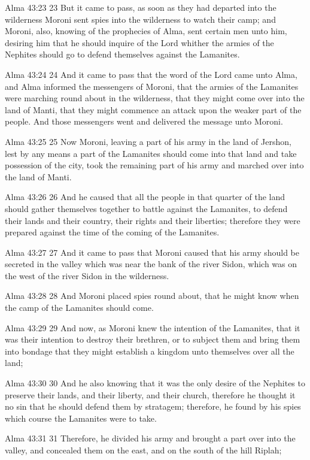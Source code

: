 Alma 43:23
 23 But it came to pass, as soon as they had departed into the
wilderness Moroni sent spies into the wilderness to watch their
camp; and Moroni, also, knowing of the prophecies of Alma, sent
certain men unto him, desiring him that he should inquire of the
Lord whither the armies of the Nephites should go to defend
themselves against the Lamanites.

Alma 43:24
 24 And it came to pass that the word of the Lord came unto Alma,
and Alma informed the messengers of Moroni, that the armies of
the Lamanites were marching round about in the wilderness, that
they might come over into the land of Manti, that they might
commence an attack upon the weaker part of the people. And those
messengers went and delivered the message unto Moroni.

Alma 43:25
 25 Now Moroni, leaving a part of his army in the land of
Jershon, lest by any means a part of the Lamanites should come
into that land and take possession of the city, took the
remaining part of his army and marched over into the land of
Manti.

Alma 43:26
 26 And he caused that all the people in that quarter of the land
should gather themselves together to battle against the
Lamanites, to defend their lands and their country, their rights
and their liberties; therefore they were prepared against the
time of the coming of the Lamanites.

Alma 43:27
 27 And it came to pass that Moroni caused that his army should
be secreted in the valley which was near the bank of the river
Sidon, which was on the west of the river Sidon in the
wilderness.

Alma 43:28
 28 And Moroni placed spies round about, that he might know when
the camp of the Lamanites should come.

Alma 43:29
 29 And now, as Moroni knew the intention of the Lamanites, that
it was their intention to destroy their brethren, or to subject
them and bring them into bondage that they might establish a
kingdom unto themselves over all the land;

Alma 43:30
 30 And he also knowing that it was the only desire of the
Nephites to preserve their lands, and their liberty, and their
church, therefore he thought it no sin that he should defend them
by stratagem; therefore, he found by his spies which course the
Lamanites were to take.

Alma 43:31
 31 Therefore, he divided his army and brought a part over into
the valley, and concealed them on the east, and on the south of
the hill Riplah;

